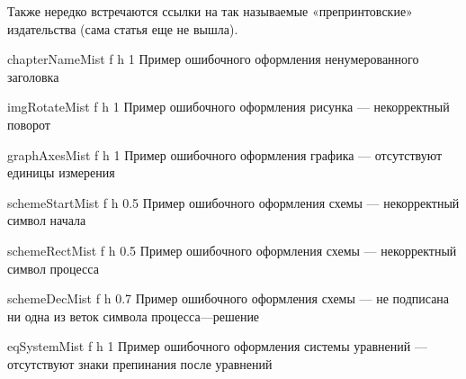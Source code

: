 Также нередко встречаются ссылки на так называемые «препринтовские» издательства (сама статья еще не вышла).

{chapterNameMist} %
{f} %
{h} %
{1\textwidth} %
{Пример ошибочного оформления ненумерованного заголовка} %

{imgRotateMist} %
{f} %
{h} %
{1\textwidth} %
{Пример ошибочного оформления рисунка --- некорректный поворот} %

{graphAxesMist} %
{f} %
{h} %
{1\textwidth} %
{Пример ошибочного оформления графика --- отсутствуют единицы измерения} %

{schemeStartMist} %
{f} %
{h} %
{0.5\textwidth} %
{Пример ошибочного оформления схемы --- некорректный символ начала} %

{schemeRectMist} %
{f} %
{h} %
{0.5\textwidth} %
{Пример ошибочного оформления схемы --- некорректный символ процесса} %

{schemeDecMist} %
{f} %
{h} %
{0.7\textwidth} %
{Пример ошибочного оформления схемы --- не подписана ни одна из веток символа процесса---решение} %

{eqSystemMist} %
{f} %
{h} %
{1\textwidth} %
{Пример ошибочного оформления системы уравнений --- отсутствуют знаки препинания после уравнений} %

